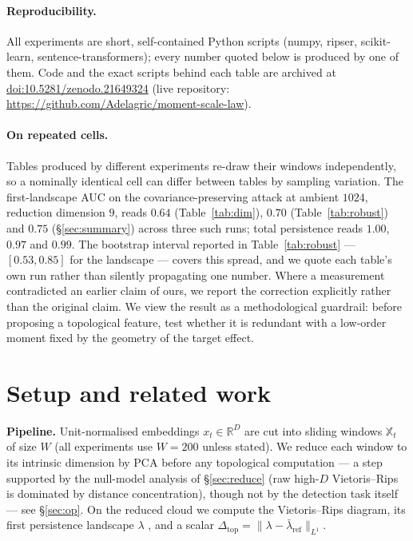 \documentclass[11pt]{article}
\theoremstyle{remark}
\begin{document}
\paragraph{Reproducibility.} All experiments are short, self-contained Python scripts (numpy,
ripser, scikit-learn, sentence-transformers); every number quoted below is produced by one of them.
Code and the exact scripts behind each table are archived at \href{https://doi.org/10.5281/zenodo.21649324}{doi:10.5281/zenodo.21649324} (live repository: \url{https://github.com/Adelagric/moment-scale-law}).

\paragraph{On repeated cells.} Tables produced by different experiments re-draw their windows
independently, so a nominally identical cell can differ between tables by sampling variation. The
first-landscape AUC on the covariance-preserving attack at ambient $1024$, reduction dimension $9$,
reads $0.64$ (Table~\ref{tab:dim}), $0.70$ (Table~\ref{tab:robust}) and $0.75$
(\S\ref{sec:summary}) across three such runs; total persistence reads $1.00$, $0.97$ and $0.99$.
The bootstrap interval reported in Table~\ref{tab:robust} --- $[0.53,0.85]$ for the landscape ---
covers this spread, and we quote each table's own run rather than silently propagating one number. Where a measurement contradicted an earlier claim of ours, we report the
correction explicitly rather than the original claim.
We view the result as a methodological guardrail: before proposing a topological feature, test
whether it is redundant with a low-order moment fixed by the geometry of the target effect.

\section{Setup and related work}
\textbf{Pipeline.} Unit-normalised embeddings $x_t\in\mathbb{R}^D$ are cut into sliding windows
$\mathbb{X}_t$ of size $W$ (all experiments use $W=200$ unless stated). We reduce each window to its intrinsic dimension by PCA before any
topological computation --- a step supported by the null-model analysis of \S\ref{sec:reduce} (raw high-$D$
Vietoris--Rips is dominated by distance concentration), though not by the detection task itself
--- see \S\ref{sec:op}. On the reduced cloud we compute
the Vietoris--Rips diagram, its first persistence landscape $\lambda$ \citep{bubenik2015landscapes},
and a scalar $\Delta_{\mathrm{top}}=\lVert\lambda-\bar\lambda_{\mathrm{ref}}\rVert_{L^1}$.
\end{document}
